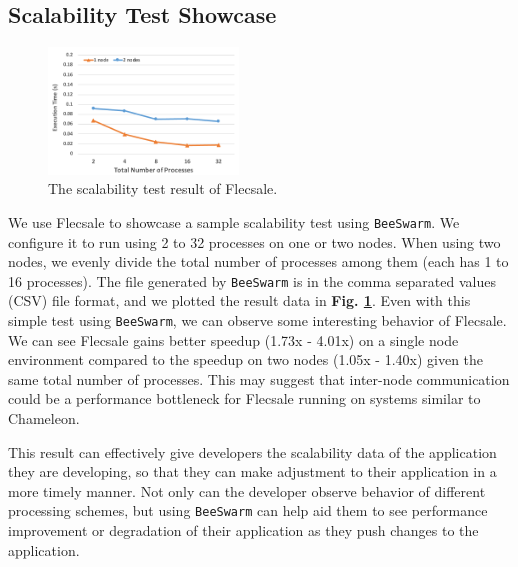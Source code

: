\subsection{Scalability Test Showcase}

\begin{figure}[h]
    \centering
    \includegraphics[width=0.45\textwidth]{figures/flecsale-result.pdf}
    \caption{The scalability test result of Flecsale.}
    \label{flecsale-result}
\end{figure}

We use Flecsale to showcase a sample scalability test using \texttt{BeeSwarm}. We configure it to run using 2 to 32 processes on one or two nodes. When using two nodes, we evenly divide the total number of processes among them (each has 1 to 16 processes). The file generated by \texttt{BeeSwarm} is in the comma separated values (CSV) file format, and we plotted the result data in \textbf{Fig. \ref{flecsale-result}}. %
Even with this simple test using \texttt{BeeSwarm}, we can observe some interesting behavior of Flecsale. We can see Flecsale gains better speedup (1.73x - 4.01x) on a single node environment compared to the speedup on two nodes (1.05x - 1.40x) given the same total number of processes. This may suggest that inter-node communication could be a performance bottleneck for Flecsale running on systems similar to Chameleon.



This result can effectively give developers the scalability data of the application they are developing, so that they can make adjustment to their application in a more timely manner. Not only can the developer observe behavior of different processing schemes, but using \texttt{BeeSwarm} can help aid them to see performance improvement or degradation of their application as they push changes to the application. %